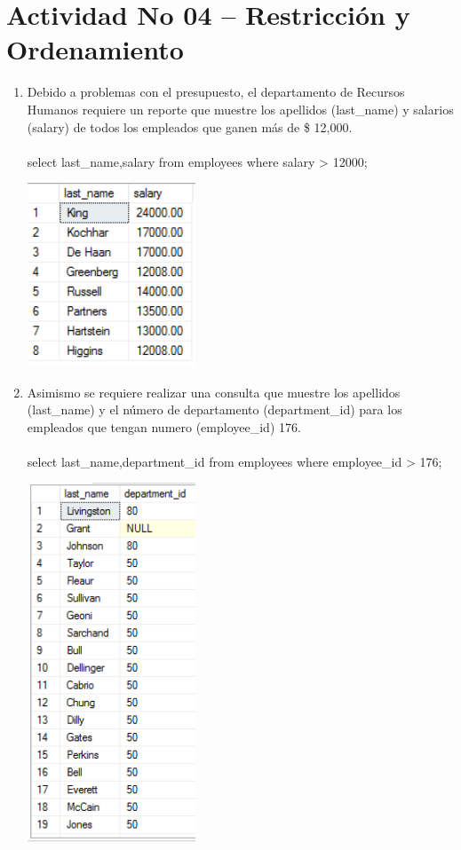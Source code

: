 \section{Actividad No 04 – Restricci\'on y Ordenamiento} 
		
\begin{enumerate}[1.]
	\item Debido a problemas con el presupuesto, el departamento de Recursos Humanos requiere un reporte que muestre los apellidos (last\_name) y salarios (salary) de todos los empleados que ganen más de \$ 12,000.
	\\ \\ select last\_name,salary from employees where salary > 12000;

	\begin{center}
	\includegraphics[width=5cm]{./Imagenes/actividad_04_01} 
	\end{center}

	\item Asimismo se requiere realizar una consulta que muestre los apellidos (last\_name) y el n\'umero de departamento (department\_id) para los empleados que tengan numero (employee\_id) 176.
	\\ \\select last\_name,department\_id from employees where employee\_id > 176;

	\begin{center}
	\includegraphics[width=5cm]{./Imagenes/actividad_04_02} 
	\end{center}


\end{enumerate}
